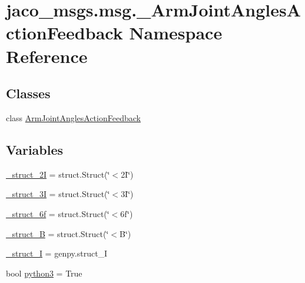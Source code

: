\hypertarget{namespacejaco__msgs_1_1msg_1_1__ArmJointAnglesActionFeedback}{}\section{jaco\+\_\+msgs.\+msg.\+\_\+\+Arm\+Joint\+Angles\+Action\+Feedback Namespace Reference}
\label{namespacejaco__msgs_1_1msg_1_1__ArmJointAnglesActionFeedback}
\subsection*{Classes}
\begin{DoxyCompactItemize}
\item 
class \hyperlink{classjaco__msgs_1_1msg_1_1__ArmJointAnglesActionFeedback_1_1ArmJointAnglesActionFeedback}{Arm\+Joint\+Angles\+Action\+Feedback}
\end{DoxyCompactItemize}
\subsection*{Variables}
\begin{DoxyCompactItemize}
\item 
\hyperlink{namespacejaco__msgs_1_1msg_1_1__ArmJointAnglesActionFeedback_acce6cd199f5ecaa244b2a7272d74f496}{\+\_\+struct\+\_\+2I} = struct.\+Struct(\char`\"{}$<$2\+I\char`\"{})
\item 
\hyperlink{namespacejaco__msgs_1_1msg_1_1__ArmJointAnglesActionFeedback_ae54ce075378016a7fc426074751f8ba4}{\+\_\+struct\+\_\+3I} = struct.\+Struct(\char`\"{}$<$3\+I\char`\"{})
\item 
\hyperlink{namespacejaco__msgs_1_1msg_1_1__ArmJointAnglesActionFeedback_a7232a2d53cb9df37c764d6ad7ec70781}{\+\_\+struct\+\_\+6f} = struct.\+Struct(\char`\"{}$<$6f\char`\"{})
\item 
\hyperlink{namespacejaco__msgs_1_1msg_1_1__ArmJointAnglesActionFeedback_af231b63047a894f5edce4d5330d5d5df}{\+\_\+struct\+\_\+B} = struct.\+Struct(\char`\"{}$<$B\char`\"{})
\item 
\hyperlink{namespacejaco__msgs_1_1msg_1_1__ArmJointAnglesActionFeedback_aacffa4547d5dfbe70a8388c7be4e821b}{\+\_\+struct\+\_\+I} = genpy.\+struct\+\_\+I
\item 
bool \hyperlink{namespacejaco__msgs_1_1msg_1_1__ArmJointAnglesActionFeedback_a67c4fbef760e6b6d22f215c3ab2ed730}{python3} = True
\end{DoxyCompactItemize}


